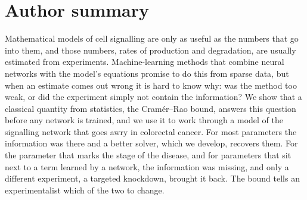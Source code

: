 \section*{Author summary}
Mathematical models of cell signalling are only as useful as the numbers that go
into them, and those numbers, rates of production and degradation, are usually
estimated from experiments. Machine-learning methods that combine neural
networks with the model's equations promise to do this from sparse data, but
when an estimate comes out wrong it is hard to know why: was the method too
weak, or did the experiment simply not contain the information? We show that a
classical quantity from statistics, the Cram\'er--Rao bound, answers this
question before any network is trained, and we use it to work through a model of
the signalling network that goes awry in colorectal cancer. For most parameters
the information was there and a better solver, which we develop, recovers them.
For the parameter that marks the stage of the disease, and for parameters that
sit next to a term learned by a network, the information was missing, and only a
different experiment, a targeted knockdown, brought it back. The bound tells an
experimentalist which of the two to change.
